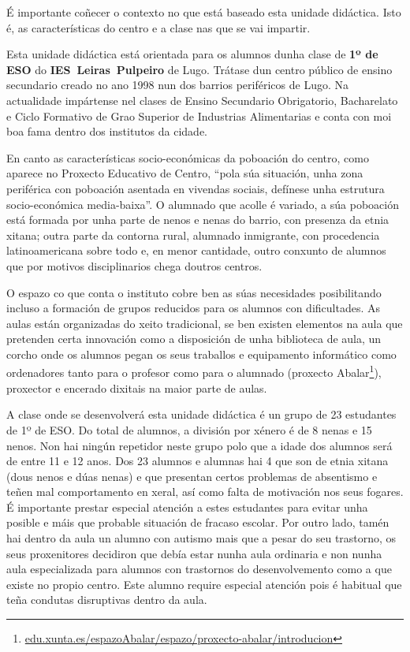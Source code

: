 
É importante coñecer o contexto no que está baseado esta unidade didáctica. Isto é, as características do centro e a clase nas que se vai impartir.

Esta unidade didáctica está orientada para os alumnos dunha clase de \textbf{1º de ESO} do \textbf{IES~Leiras~Pulpeiro} de Lugo. Trátase dun centro público de ensino secundario creado no ano 1998 nun dos barrios periféricos de Lugo. Na actualidade impártense nel clases de Ensino Secundario Obrigatorio, Bacharelato e Ciclo Formativo de Grao Superior de Industrias Alimentarias e conta con moi boa fama dentro dos institutos da cidade.

En canto as características socio-económicas da poboación do centro, como aparece no Proxecto Educativo de Centro, ``pola súa situación, unha zona periférica con poboación asentada en vivendas sociais, defínese unha estrutura socio-económica media-baixa''. O alumnado que acolle é variado, a súa poboación está formada por unha parte de nenos e nenas do barrio, con presenza da etnia xitana; outra parte da contorna rural, alumnado inmigrante, con procedencia latinoamericana sobre todo e, en menor cantidade, outro conxunto de alumnos que por motivos disciplinarios chega doutros centros.

 O espazo co que conta o instituto cobre ben as súas necesidades posibilitando incluso a formación de grupos reducidos para os alumnos con dificultades. As aulas están organizadas do xeito tradicional, se ben existen elementos na aula que pretenden certa innovación como a disposición de unha biblioteca de aula, un corcho onde os alumnos pegan os seus traballos e equipamento informático como ordenadores tanto para o profesor como para o alumnado (proxecto Abalar\footnote{\href{https://www.edu.xunta.es/espazoAbalar/espazo/proxecto-abalar/introducion}{edu.xunta.es/espazoAbalar/espazo/proxecto-abalar/introducion}}), proxector e encerado dixitais na maior parte de aulas.

A clase onde se desenvolverá esta unidade didáctica é un grupo de 23 estudantes de 1º de ESO. Do total de alumnos, a división por xénero é de 8 nenas e 15 nenos. Non hai ningún repetidor neste grupo polo que a idade dos alumnos será de entre 11 e 12 anos. Dos 23 alumnos e alumnas hai 4 que son de etnia xitana (dous nenos e dúas nenas) e que presentan certos problemas de absentismo e teñen mal comportamento en xeral, así como falta de motivación nos seus fogares. É importante prestar especial atención a estes estudantes para evitar unha posible e máis que probable situación de fracaso escolar. Por outro lado, tamén hai dentro da aula un alumno con autismo mais que a pesar do seu trastorno, os seus proxenitores decidiron que debía estar nunha aula ordinaria e non nunha aula especializada para alumnos con trastornos do desenvolvemento como a que existe no propio centro. Este alumno require especial atención pois é habitual que teña condutas disruptivas dentro da aula.

